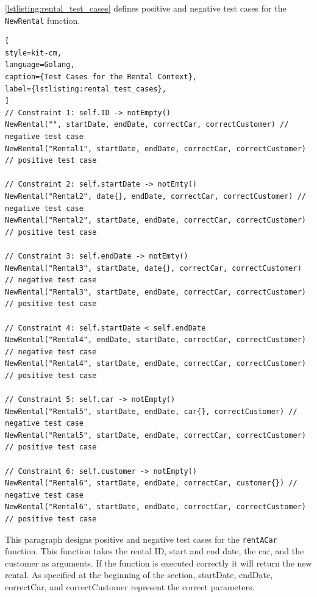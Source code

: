 \autoref{lstlisting:rental_test_cases} defines positive and negative test cases for the \texttt{NewRental} function.
\begin{lstlisting}[
style=kit-cm,
language=Golang,
caption={Test Cases for the Rental Context},
label={lstlisting:rental_test_cases},
]
// Constraint 1: self.ID -> notEmpty()
NewRental("", startDate, endDate, correctCar, correctCustomer) // negative test case
NewRental("Rental1", startDate, endDate, correctCar, correctCustomer) // positive test case

// Constraint 2: self.startDate -> notEmty()
NewRental("Rental2", date{}, endDate, correctCar, correctCustomer) // negative test case
NewRental("Rental2", startDate, endDate, correctCar, correctCustomer) // positive test case

// Constraint 3: self.endDate -> notEmty()
NewRental("Rental3", startDate, date{}, correctCar, correctCustomer) // negative test case
NewRental("Rental3", startDate, endDate, correctCar, correctCustomer) // positive test case

// Constraint 4: self.startDate < self.endDate
NewRental("Rental4", endDate, startDate, correctCar, correctCustomer) // negative test case
NewRental("Rental4", startDate, endDate, correctCar, correctCustomer) // positive test case

// Constraint 5: self.car -> notEmpty()
NewRental("Rental5", startDate, endDate, car{}, correctCustomer) // negative test case
NewRental("Rental5", startDate, endDate, correctCar, correctCustomer) // positive test case

// Constraint 6: self.customer -> notEmpty()
NewRental("Rental6", startDate, endDate, correctCar, customer{}) // negative test case
NewRental("Rental6", startDate, endDate, correctCar, correctCustomer) // positive test case
\end{lstlisting}
  
This paragraph designs positive and negative test cases for the \texttt{rentACar\(\)} function.
This function takes the rental ID, start and end date, the car, and the customer as arguments.
If the function is executed correctly it will return the new rental.
As specified at the beginning of the section, startDate, endDate, correctCar, and correctCustomer represent the correct parameters.


